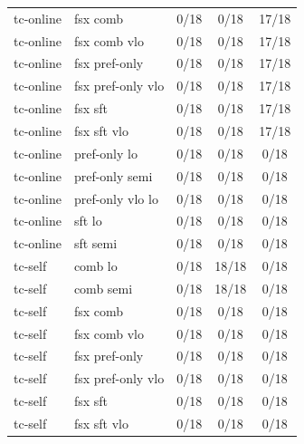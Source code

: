 \documentclass[10pt,landscape]{article}
\begin{document}
\begin{tabular}{llccc}
tc-online & fsx comb & \cellcolor{missing}0/18 & \cellcolor{missing}0/18 & \cellcolor{partial}17/18 \\
tc-online & fsx comb vlo & \cellcolor{missing}0/18 & \cellcolor{missing}0/18 & \cellcolor{partial}17/18 \\
tc-online & fsx pref-only & \cellcolor{missing}0/18 & \cellcolor{missing}0/18 & \cellcolor{partial}17/18 \\
tc-online & fsx pref-only vlo & \cellcolor{missing}0/18 & \cellcolor{missing}0/18 & \cellcolor{partial}17/18 \\
tc-online & fsx sft & \cellcolor{missing}0/18 & \cellcolor{missing}0/18 & \cellcolor{partial}17/18 \\
tc-online & fsx sft vlo & \cellcolor{missing}0/18 & \cellcolor{missing}0/18 & \cellcolor{partial}17/18 \\
tc-online & pref-only lo & \cellcolor{missing}0/18 & \cellcolor{missing}0/18 & \cellcolor{missing}0/18 \\
tc-online & pref-only semi & \cellcolor{missing}0/18 & \cellcolor{missing}0/18 & \cellcolor{missing}0/18 \\
tc-online & pref-only vlo lo & \cellcolor{missing}0/18 & \cellcolor{missing}0/18 & \cellcolor{missing}0/18 \\
tc-online & sft lo & \cellcolor{missing}0/18 & \cellcolor{missing}0/18 & \cellcolor{missing}0/18 \\
tc-online & sft semi & \cellcolor{missing}0/18 & \cellcolor{missing}0/18 & \cellcolor{missing}0/18 \\
tc-self & comb lo & \cellcolor{missing}0/18 & \cellcolor{done}18/18 & \cellcolor{missing}0/18 \\
tc-self & comb semi & \cellcolor{missing}0/18 & \cellcolor{done}18/18 & \cellcolor{missing}0/18 \\
tc-self & fsx comb & \cellcolor{missing}0/18 & \cellcolor{missing}0/18 & \cellcolor{missing}0/18 \\
tc-self & fsx comb vlo & \cellcolor{missing}0/18 & \cellcolor{missing}0/18 & \cellcolor{missing}0/18 \\
tc-self & fsx pref-only & \cellcolor{missing}0/18 & \cellcolor{missing}0/18 & \cellcolor{missing}0/18 \\
tc-self & fsx pref-only vlo & \cellcolor{missing}0/18 & \cellcolor{missing}0/18 & \cellcolor{missing}0/18 \\
tc-self & fsx sft & \cellcolor{missing}0/18 & \cellcolor{missing}0/18 & \cellcolor{missing}0/18 \\
tc-self & fsx sft vlo & \cellcolor{missing}0/18 & \cellcolor{missing}0/18 & \cellcolor{missing}0/18 \\

\end{tabular}
\end{document}
